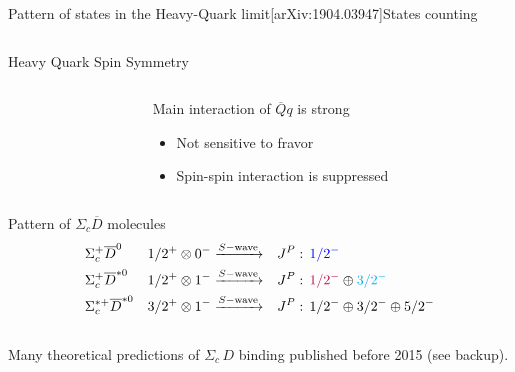 \documentclass[aspectratio=169]{beamer}
\newcommand{\paper}[1]{{\scriptsize[#1]}}
\begin{document}
\begin{frame}{Pattern of states in the Heavy-Quark limit\hfill\paper{arXiv:1904.03947}}{States counting}
\begin{columns}
\begin{column}{0.5\textwidth}
\begin{block}{Heavy Quark Spin Symmetry}
\begin{columns}
\begin{column}{0.3\textwidth}
                    \end{column}
                    \begin{column}{0.7\textwidth}
                        Main interaction of $\overline{Q}q$ is strong
                        \begin{itemize}
                            \item Not sensitive to fravor
                            \item Spin-spin interaction is suppressed
                        \end{itemize}
                    \end{column}
                \end{columns}
            \end{block}
            \begin{exampleblock}{Pattern of $\Sigma_c \overline{D}$ molecules}
            \vspace{-3mm}
            {\scriptsize
            \begin{align*}
                &\Sigma_c^+ \overline{D}^{0}     & 1/2^+ \otimes 0^- \xrightarrow[]{S-\text{wave}}&&& J^P:\,\color{blue}1/2^-\\
                &\Sigma_c^+ \overline{D}^{*0}    & {1}/{2}^+ \otimes 1^- \xrightarrow[]{S-\text{wave}}&&& J^P:\,{\color{purple}{1}/{2}^-}\oplus{\color{cyan}{3}/{2}^-}\\
                &\Sigma_c^{*+} \overline{D}^{*0} & {3}/{2}^+ \otimes 1^- \xrightarrow[]{S-\text{wave}}&&& J^P:\,{1}/{2}^-\oplus{3}/{2}^-\oplus{5}/{2}^-
            \end{align*}}
            \vspace{-7mm}\\
            \scriptsize
            Many theoretical predictions of $\Sigma_c\,D$ binding
            published before 2015 (see backup).
            \end{exampleblock}

\end{column}
\end{columns}
\end{frame}
\end{document}
